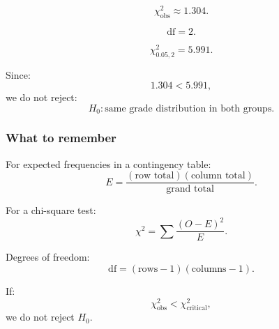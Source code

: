 \documentclass[10pt]{article}
\begin{document}
\[
\chi^2_{\text{obs}}\approx 1.304.
\]

\[
\text{df}=2.
\]

\[
\chi^2_{0.05,2}=5.991.
\]

Since:
\[
1.304<5.991,
\]
we do not reject:
\[
H_0:
\text{same grade distribution in both groups.}
\]

\subsubsection*{What to remember}

For expected frequencies in a contingency table:
\[
E=
\frac{
(\text{row total})(\text{column total})
}{
\text{grand total}
}.
\]

For a chi-square test:
\[
\chi^2
=
\sum
\frac{(O-E)^2}{E}.
\]

Degrees of freedom:
\[
\text{df}
=
(\text{rows}-1)(\text{columns}-1).
\]

If:
\[
\chi^2_{\text{obs}}
<
\chi^2_{\text{critical}},
\]
we do not reject \(H_0\).
\end{document}
